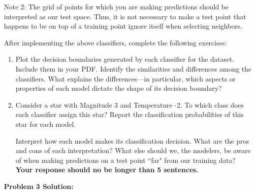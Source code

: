 \documentclass[submit]{harvardml}
\begin{document}
\begin{problem}
\begin{enumerate}[label=\alph*)]
  Note 2: The grid of points for which you are making predictions
  should be interpreted as our test space.  Thus, it is not necessary
  to make a test point that happens to be on top of a training point
  ignore itself when selecting neighbors.

\end{enumerate}

After implementing the above classifiers, complete the following exercises:

\begin{enumerate}
    \item Plot the decision boundaries generated by each classifier for the dataset. Include them in your PDF. 
    Identify the similarities and differences among the classifiers. What explains the differences---in particular, which aspects or properties of each model dictate the shape of its decision boundary? 
    
    \item 
    
    Consider a star with Magnitude 3 and Temperature -2. To which class does each classifier assign this star? Report the classification probabilities of this star for each model. 
    
    Interpret how each model makes its classification decision. What are the pros and cons of each interpretation? What else should we, the modelers, be aware of when making predictions on a test point ``far" from our training data? \textbf{Your response should no be longer than 5 sentences.}
\end{enumerate}
\end{problem}
\pagebreak
\textbf{Problem 3 Solution:}\\
\end{document}
